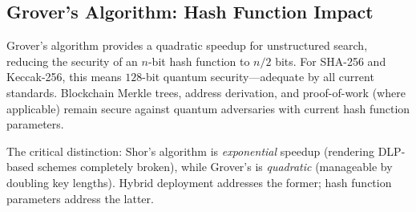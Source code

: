 \subsection{Grover's Algorithm: Hash Function Impact}

Grover's algorithm provides a quadratic speedup for unstructured search, reducing
the security of an $n$-bit hash function to $n/2$ bits. For SHA-256 and Keccak-256,
this means $128$-bit quantum security---adequate by all current standards. Blockchain
Merkle trees, address derivation, and proof-of-work (where applicable) remain secure
against quantum adversaries with current hash function parameters.

The critical distinction: Shor's algorithm is \emph{exponential} speedup (rendering
DLP-based schemes completely broken), while Grover's is \emph{quadratic} (manageable
by doubling key lengths). Hybrid deployment addresses the former; hash function
parameters address the latter.

